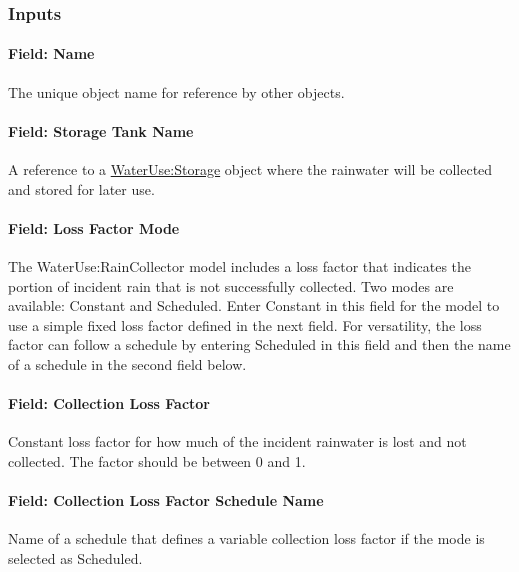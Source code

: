 \subsubsection{Inputs}\label{inputs-3-041}

\paragraph{Field: Name}\label{field-name-3-037}

The unique object name for reference by other objects.

\paragraph{Field: Storage Tank Name}\label{field-storage-tank-name}

A reference to a \hyperref[waterusestorage]{WaterUse:Storage} object where the rainwater will be collected and stored for later use.

\paragraph{Field: Loss Factor Mode}\label{field-loss-factor-mode}

The WaterUse:RainCollector model includes a loss factor that indicates the portion of incident rain that is not successfully collected. Two modes are available: Constant and Scheduled. Enter Constant in this field for the model to use a simple fixed loss factor defined in the next field. For versatility, the loss factor can follow a schedule by entering Scheduled in this field and then the name of a schedule in the second field below.

\paragraph{Field: Collection Loss Factor}\label{field-collection-loss-factor}

Constant loss factor for how much of the incident rainwater is lost and not collected. The factor should be between 0 and 1.

\paragraph{Field: Collection Loss Factor Schedule Name}\label{field-collection-loss-factor-schedule-name}

Name of a schedule that defines a variable collection loss factor if the mode is selected as Scheduled.


